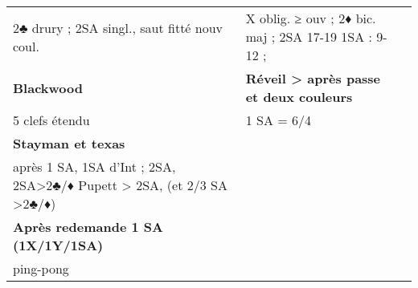 \documentclass[a5paper]{article}
\def\size{}
\newcommand{\g}[1]{\textbf{#1}}
\begin{document}
{{\begin{tabular}{p{}|p{}|p{}}
	2♣ drury  ; 2SA singl., saut fitté nouv coul. & X oblig. ≥ ouv  ; 2♦ bic. maj ; 2SA 17-19 1SA : 9-12   ; & \\
	
	\g{Blackwood} & \g{Réveil > après passe et deux couleurs} \\
	
	5 clefs étendu & 1 SA = 6/4							 \\
	
	\g{Stayman et texas} \\
	après 1 SA, 1SA d'Int ; 2SA, 2SA>2♣/♦  Pupett > 2SA, (et 2/3 SA >2♣/♦) \\
	
	\g{Après redemande 1 SA (1X/1Y/1SA)} \\
	 
	ping-pong \\
	\end{tabular}
	}
}


\dolistloop{\size}
\end{document}

